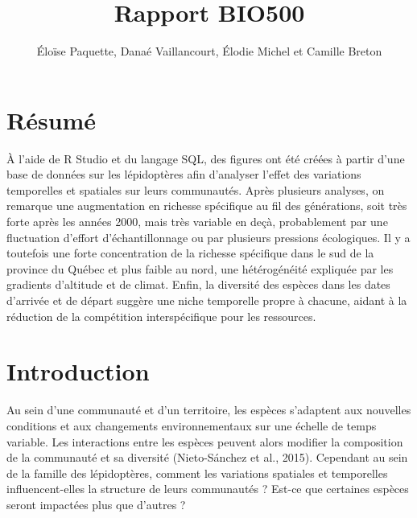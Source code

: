 \documentclass[9pt,twocolumn,twoside,]{pnas-new}
\title{Rapport BIO500}
\author[]{Éloïse Paquette, Danaé Vaillancourt, Élodie Michel et Camille
Breton}
\begin{document}
\verticaladjustment{-2pt}



\maketitle
\thispagestyle{firststyle}


\acknow{}

\section*{Résumé}\label{ruxe9sumuxe9}

À l'aide de R Studio et du langage SQL, des figures ont été créées à
partir d'une base de données sur les lépidoptères afin d'analyser
l'effet des variations temporelles et spatiales sur leurs communautés.
Après plusieurs analyses, on remarque une augmentation en richesse
spécifique au fil des générations, soit très forte après les années
2000, mais très variable en deçà, probablement par une fluctuation
d'effort d'échantillonnage ou par plusieurs pressions écologiques. Il y
a toutefois une forte concentration de la richesse spécifique dans le
sud de la province du Québec et plus faible au nord, une hétérogénéité
expliquée par les gradients d'altitude et de climat. Enfin, la diversité
des espèces dans les dates d'arrivée et de départ suggère une niche
temporelle propre à chacune, aidant à la réduction de la compétition
interspécifique pour les ressources.

\section*{Introduction}\label{introduction}

Au sein d'une communauté et d'un territoire, les espèces s'adaptent aux
nouvelles conditions et aux changements environnementaux sur une échelle
de temps variable. Les interactions entre les espèces peuvent alors
modifier la composition de la communauté et sa diversité (Nieto-Sánchez
et al., 2015). Cependant au sein de la famille des lépidoptères, comment
les variations spatiales et temporelles influencent-elles la structure
de leurs communautés ? Est-ce que certaines espèces seront impactées
plus que d'autres ?
\end{document}
